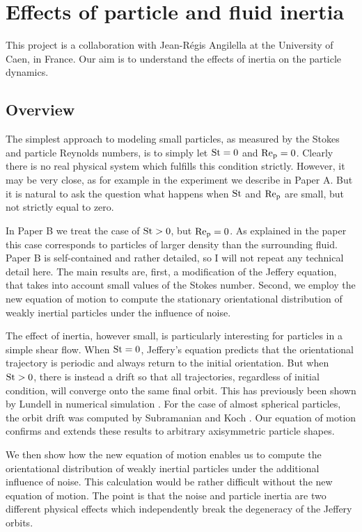 \documentclass[thesis.tex]{subfiles}
\begin{document}
\chapter{Effects of particle and fluid inertia}

This project is a collaboration with Jean-R\'egis Angilella at the University of Caen, in France. Our aim is to understand the effects of inertia on the particle dynamics.

\section{Overview}

The simplest approach to modeling small particles, as measured by the Stokes and particle Reynolds numbers, is to simply let $\mbox{St}=0$ and $\mbox{Re}_{\mathrm p}=0$. Clearly there is no real physical system which fulfills this condition strictly. However, it may be very close, as for example in the experiment we describe in Paper A. But it is natural to ask the question what happens when $\mbox{St}$ and $\mbox{Re}_{\mathrm p}$ are small, but not strictly equal to zero.

In Paper B we treat the case of $\mbox{St}>0$, but $\mbox{Re}_{\mathrm p}=0$. As explained in the paper this case corresponds to particles of larger density than the surrounding fluid. Paper B is self-contained and rather detailed, so I will not repeat any technical detail here. The main results are, first, a modification of the Jeffery equation, that takes into account small values of the Stokes number. Second, we employ the new equation of motion to compute the stationary orientational distribution of weakly inertial particles under the influence of noise. 

The effect of inertia, however small, is particularly interesting for particles in a simple shear flow. When $\mbox{St}=0$, Jeffery's equation predicts that the orientational trajectory is periodic and always return to the initial orientation. But when $\mbox{St}>0$, there is instead a drift so that all trajectories, regardless of initial condition, will converge onto the same final orbit. This has previously been shown by Lundell in numerical simulation \cite{lundell2010}. For the case of almost spherical particles, the orbit drift was computed by Subramanian and Koch \cite{subramanian2006}. Our equation of motion confirms and extends these results to arbitrary axisymmetric particle shapes.

We then show how the new equation of motion enables us to compute the orientational distribution of weakly inertial particles under the additional influence of noise. This calculation would be rather difficult without the new equation of motion. The point is that the noise and particle inertia are two different physical effects which independently break the degeneracy of the Jeffery orbits. 
\end{document}

